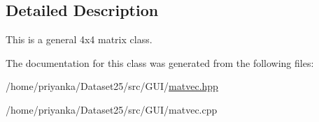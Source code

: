 \subsection{\-Detailed \-Description}
\-This is a general 4x4 matrix class. 

\-The documentation for this class was generated from the following files\-:\begin{DoxyCompactItemize}
\item 
/home/priyanka/\-Dataset25/src/\-G\-U\-I/\hyperlink{matvec_8hpp}{matvec.\-hpp}\item 
/home/priyanka/\-Dataset25/src/\-G\-U\-I/matvec.\-cpp\end{DoxyCompactItemize}
